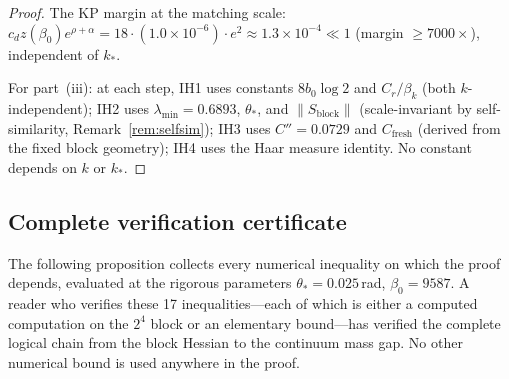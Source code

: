 \documentclass[11pt]{article}
\theoremstyle{definition}
\begin{document}
\begin{proof}
The KP margin at the matching scale:
$c_d z(\beta_0)e^{\rho+\alpha}
=18\cdot(1.0\times 10^{-6})\cdot e^2
\approx 1.3\times 10^{-4}\ll 1$
(margin $\ge 7000\times$), independent of $k_*$.

For part~(iii): at each step, IH1 uses constants
$8b_0\log 2$ and $C_r/\beta_k$ (both $k$-independent);
IH2 uses $\lambda_{\min}=0.6893$, $\theta_*$, and
$\|S_{\mathrm{block}}\|$ (scale-invariant by
self-similarity, Remark~\ref{rem:selfsim});
IH3 uses $C''=0.0729$ and $C_{\mathrm{fresh}}$
(derived from the fixed block geometry);
IH4 uses the Haar measure identity.
No constant depends on $k$ or $k_*$.
\end{proof}

\subsection{Complete verification certificate}%
\label{subsec:certificate}

The following proposition collects every numerical
inequality on which the proof depends, evaluated at the
rigorous parameters $\theta_*=0.025$\,rad, $\beta_0=9587$.
A reader who verifies these 17 inequalities---each of which
is either a computed computation on the $2^4$ block or an
elementary bound---has verified the complete logical chain
from the block Hessian to the continuum mass gap.
No other numerical bound is used anywhere in the proof.
\end{document}
